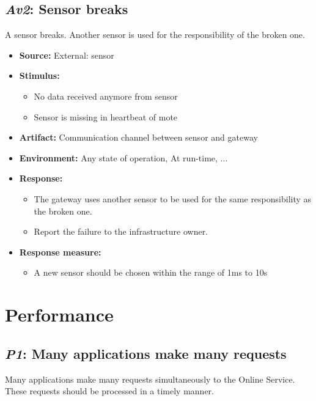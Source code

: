 \documentclass[english]{sareport}
\begin{document}
\subsection{\emph{Av2}: Sensor breaks}
A sensor breaks. Another sensor is used for the responsibility of the broken one.

\begin{itemize}
    \item \textbf{Source:} External: sensor
    \item \textbf{Stimulus:}
        \begin{itemize}
            \item No data received anymore from sensor
            \item Sensor is missing in heartbeat of mote
        \end{itemize}

    \item \textbf{Artifact:} Communication channel between sensor and gateway
    \item \textbf{Environment:} Any state of operation, At run-time, ...
    \item \textbf{Response:}
        \begin{itemize}
            \item The gateway uses another sensor to be used for the same responsibility as the broken one.
            \item Report the failure to the infrastructure owner.
        \end{itemize}

    \item \textbf{Response measure:}
        \begin{itemize}
            \item A new sensor should be chosen within the range of 1ms to 10s %
        \end{itemize}
\end{itemize}

\section{Performance}
\subsection{\emph{P1}: Many applications make many requests}
Many applications make many requests simultaneously to the Online Service.
These requests should be processed in a timely manner.
\end{document}
